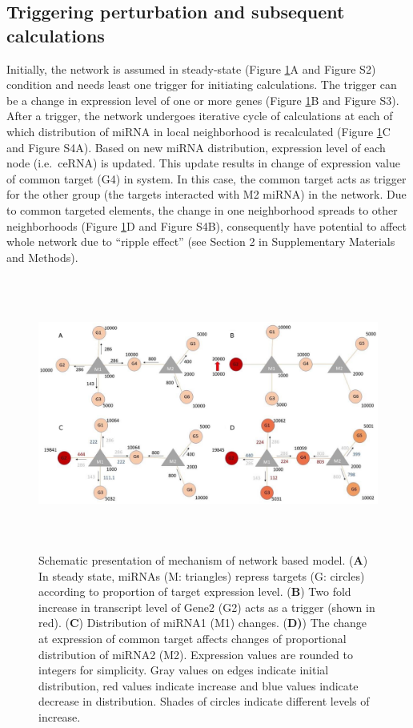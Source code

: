 \documentclass[a4,center,fleqn]{NAR}
\begin{document}
\subsection{Triggering perturbation and subsequent calculations}

Initially, the network is assumed in steady-state (Figure
\ref{fig:fig1}A and Figure S2) condition and needs least one trigger for
initiating calculations. The trigger can be a change in expression level
of one or more genes (Figure \ref{fig:fig1}B and Figure S3). After a
trigger, the network undergoes iterative cycle of calculations at each
of which distribution of miRNA in local neighborhood is recalculated
(Figure \ref{fig:fig1}C and Figure S4A). Based on new miRNA
distribution, expression level of each node (i.e.~ceRNA) is updated.
This update results in change of expression value of common target (G4)
in system. In this case, the common target acts as trigger for the other
group (the targets interacted with M2 miRNA) in the network. Due to
common targeted elements, the change in one neighborhood spreads to
other neighborhoods (Figure \ref{fig:fig1}D and Figure S4B),
consequently have potential to affect whole network due to ``ripple
effect'' (see Section 2 in Supplementary Materials and Methods).

\begin{figure}[ht]
\begin{center}
\includegraphics[width=16cm,height=9cm]{Fig1.eps}
\end{center}
\caption{Schematic presentation of mechanism of network based model. 
    (\textbf{A}) In steady state, miRNAs (M: triangles) repress targets (G: circles) according to proportion of target expression level. 
    (\textbf{B}) Two fold increase in transcript level of Gene2 (G2) acts as a trigger (shown in red). 
    (\textbf{C}) Distribution of miRNA1 (M1) changes. 
    (\textbf{D)}) The change at expression of common target affects changes of proportional distribution of miRNA2 (M2). Expression values are rounded to integers for simplicity. Gray values on edges indicate initial distribution, red values indicate increase and blue values indicate decrease in distribution. Shades of circles indicate different levels of increase.}
\label{fig:fig1}
\end{figure}
\end{document}
